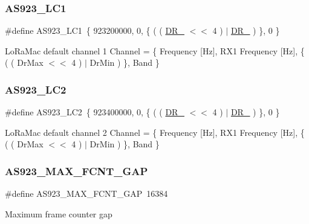 \subsubsection{\texorpdfstring{A\+S923\+\_\+\+L\+C1}{AS923\_LC1}}
{\footnotesize\ttfamily \#define A\+S923\+\_\+\+L\+C1~\{ 923200000, 0, \{ ( ( \hyperlink{group__REGION_ga872e12c82020c02a7f70a1c6ed1375df}{D\+R\+\_} $<$$<$ 4 ) $\vert$ \hyperlink{group__REGION_ga6c4ef966b4f3d5eb7597b087f2b97095}{D\+R\+\_} ) \}, 0 \}}

Lo\+Ra\+Mac default channel 1 Channel = \{ Frequency \mbox{[}Hz\mbox{]}, R\+X1 Frequency \mbox{[}Hz\mbox{]}, \{ ( ( Dr\+Max $<$$<$ 4 ) $\vert$ Dr\+Min ) \}, Band \} \mbox{\label{group__REGIONAS923_gae6a0cfa9079c4ab3097ac797506452d4}} 
\subsubsection{\texorpdfstring{A\+S923\+\_\+\+L\+C2}{AS923\_LC2}}
{\footnotesize\ttfamily \#define A\+S923\+\_\+\+L\+C2~\{ 923400000, 0, \{ ( ( \hyperlink{group__REGION_ga872e12c82020c02a7f70a1c6ed1375df}{D\+R\+\_} $<$$<$ 4 ) $\vert$ \hyperlink{group__REGION_ga6c4ef966b4f3d5eb7597b087f2b97095}{D\+R\+\_} ) \}, 0 \}}

Lo\+Ra\+Mac default channel 2 Channel = \{ Frequency \mbox{[}Hz\mbox{]}, R\+X1 Frequency \mbox{[}Hz\mbox{]}, \{ ( ( Dr\+Max $<$$<$ 4 ) $\vert$ Dr\+Min ) \}, Band \} \mbox{\label{group__REGIONAS923_ga996b3bad607207a4c54e5a2b253e5dfd}} 
\subsubsection{\texorpdfstring{A\+S923\+\_\+\+M\+A\+X\+\_\+\+F\+C\+N\+T\+\_\+\+G\+AP}{AS923\_MAX\_FCNT\_GAP}}
{\footnotesize\ttfamily \#define A\+S923\+\_\+\+M\+A\+X\+\_\+\+F\+C\+N\+T\+\_\+\+G\+AP~16384}

Maximum frame counter gap \mbox{\label{group__REGIONAS923_ga462d2371d2b936331d37530925ffb66d}} 
